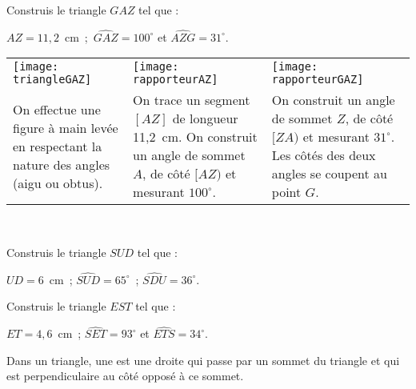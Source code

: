 \begin{methode*1}

 \begin{exemple*1}
Construis le triangle $GAZ$ tel que :

$AZ = 11,2$ cm ; $\widehat{GAZ} = 100^\circ$ et $\widehat{AZG} = 31^\circ$. \\[1em]
\begin{tabularx}{\textwidth}{X|X|X}
 \texttt{[image: triangleGAZ]} &  \texttt{[image: rapporteurAZ]} & \texttt{[image: rapporteurGAZ]} \\ 
 On effectue une figure à main levée en respectant la nature des angles (aigu ou obtus). & On trace un segment $[AZ]$ de longueur 11,2 cm. On construit un angle de sommet $A$, de côté $[AZ)$ et mesurant $100^\circ$. & On construit un angle de sommet $Z$, de côté $[ZA)$ et mesurant $31^\circ$. Les côtés des deux angles se coupent au point $G$. \\
\end{tabularx} \\

\end{exemple*1}

\exercice
Construis le triangle $SUD$ tel que :

$UD = 6$ cm ; $\widehat{SUD} = 65^\circ$ ; $\widehat{SDU} = 36^\circ$.

\exercice
Construis le triangle $EST$ tel que :

$ET = 4,6$ cm ; $\widehat{SET} = 93^\circ$ et $\widehat{ETS} = 34^\circ$.
 
\end{methode*1}



\newpage

\begin{definition}
Dans un triangle, une  est une droite qui passe par un sommet du triangle et qui est perpendiculaire au côté opposé à ce sommet.
\end{definition}

\vspace{2em}

